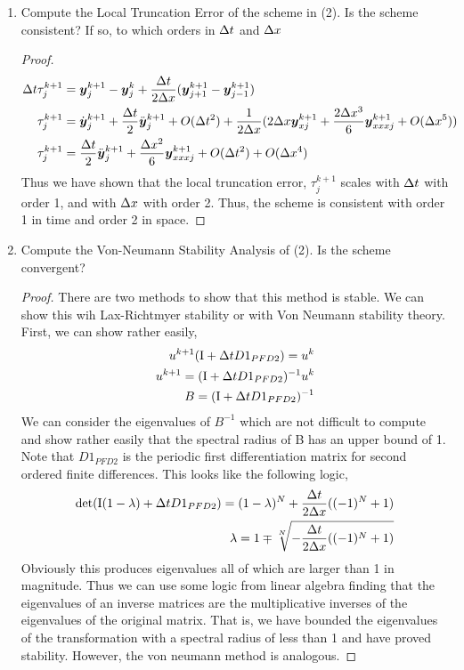 \documentclass{article}
\begin{document}
\begin{enumerate}[label=\alph*)]

    \item Compute the Local Truncation Error of the scheme in (2). Is the scheme
    consistent? If so, to which orders in $\Delta t$ and $\Delta x$
    \begin{proof}
        \begin{align*}
            \Delta t \tau_j^{k+1} &= \boldsymbol{y}_j^{k+1} - \boldsymbol{y}_j^k + \frac{\Delta t}{2\Delta x}(\boldsymbol{y}_{j+1}^{k+1}
            - \boldsymbol{y}_{j-1}^{k+1})\\
            \tau_j^{k+1} &= \dot{\boldsymbol{y}}_j^{k+1} + \frac{\Delta t}{2}\ddot{\boldsymbol{y}}_j^{k+1} +
            O(\Delta t^2) + 
            \frac{1}{2\Delta x}(2\Delta x \boldsymbol{y}_{x j}^{k+1} + \frac{2\Delta x^3}{6}
            \boldsymbol{y}_{xxx j}^{k+1}
            +O(\Delta x^5))\\
            \tau_j^{k+1} &= \frac{\Delta t}{2}\ddot{\boldsymbol{y}}_j^{k+1} +
            \frac{\Delta x^2}{6} \boldsymbol{y}_{xxx j}^{k+1} + O(\Delta t^2)+O(\Delta x^4) 
        \end{align*}
        Thus we have shown that the local truncation error, $\tau_j^{k+1}$
        scales with $\Delta t$ with order 1, and with $\Delta x$ with order 2. Thus, the
        scheme is consistent with order 1 in time and order 2 in space. 
    \end{proof}

    \item Compute the Von-Neumann Stability Analysis of (2). Is the scheme
    convergent?
    \begin{proof}
        There are two methods to show that this method is stable. We can show
        this wih Lax-Richtmyer stability or with Von Neumann stability theory.
        First, we can show rather easily, 
        \begin{align*}
            u^{k+1} (\mathrm{I} + \Delta t D1_{PFD2}) = u^{k}\\
            u^{k+1} =  (\mathrm{I} + \Delta t D1_{PFD2})^{-1} u^{k}\\
            B = (\mathrm{I} + \Delta t D1_{PFD2})^{-1}
        \end{align*}
        We can consider the eigenvalues of $B^{-1}$ which are not difficult to
        compute and show rather easily that the spectral radius of B has an
        upper bound of 1. Note that $D1_{PFD2}$ is the periodic first differentiation
        matrix for second ordered finite differences. This looks like the following logic,
        \begin{align*}
            \det(\mathrm{I}(1-\lambda) + \Delta t D1_{PFD2}) = (1 -\lambda)^N +
            \frac{\Delta t}{2\Delta x}((-1)^N + 1)\\
            \lambda = 1 \mp \sqrt[N]{-\frac{\Delta t}{2\Delta x}((-1)^N + 1)}
        \end{align*}
        Obviously this produces eigenvalues all of which are larger than 1 in
        magnitude. Thus we can use some logic from linear algebra finding that
        the eigenvalues of an inverse matrices are the multiplicative inverses
        of the eigenvalues of the original matrix. That is, we have bounded the
        eigenvalues of the transformation with a spectral radius of less than 1
        and have proved stability. However, the von neumann method is analogous.


\end{proof}
\end{enumerate}
\end{document}
